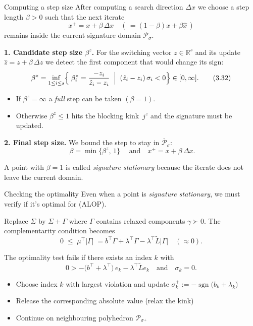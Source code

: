 \documentclass[aspectratio=169]{beamer}
\begin{document}
\begin{frame}{Computing a step size}
    After computing a search direction $\Delta x$ we choose a step length
    $\beta>0$ such that the next iterate
    \[
        x^{+} = x + \beta\,\Delta x \quad (\,= (1-\beta)x + \beta \hat{x}\,)
    \]
    remains inside the current signature domain $\mathcal P_{\sigma}$.

    \medskip
    \textbf{1.  Candidate step size $\beta^{z}$.}  For the switching vector
    $z\in\mathbb R^{s}$ and its update $\hat z = z + \beta\,\Delta z$ we
    detect the first component that would change its sign:
    \[
        \beta^{z}=\inf_{1\le i \le s} \Bigl\{\;\beta_i^{z}=\frac{-z_i}{\hat z_i-z_i}
        \;\Bigm|\;(\hat z_i-z_i)\,\sigma_i<0\Bigr\}\in[0,\infty] .  \tag{3.32}
    \]

    \begin{itemize}[<+(1)->]
        \item If $\beta^{z}=\infty$ a \emph{full} step can be taken
              $(\beta=1)$.
        \item Otherwise $\beta^{z}\le 1$ hits the blocking kink~$j^{z}$ and the
              signature must be updated.
    \end{itemize}

    \medskip
    \textbf{2.  Final step size.}  We bound the step to stay in
    $\overline{\mathcal P}_{\sigma}$:
    \[
        \boxed{\;\beta = \min\{\beta^{z},\,1\}\;} \quad\text{and}\quad
        x^{+}=x+\beta\,\Delta x. \tag{3.33}
    \]

    A point with $\beta=1$ is called \emph{signature stationary} because the
    iterate does not leave the current domain.
\end{frame}

\begin{frame}{Checking the optimality}
    Even when a point is \emph{signature stationary}, we must verify if it's optimal for (ALOP).

    \medskip
    Replace $\Sigma$ by $\Sigma+\Gamma$ where $\Gamma$ contains relaxed components $\gamma\succ 0$.
    The complementarity condition becomes
    \[
        0 \;\le\; \mu^{\top}|\Gamma| \;=
        b^{\top}\Gamma + \lambda^{\top}\Gamma - \lambda^{\top}\tilde{L}|\Gamma|
        \quad (\approx 0).
    \]

    The optimality test fails if there exists an index $k$ with
    \[
        0 > -\bigl(b^{\top}+\lambda^{\top}\bigr)\,e_k - \lambda^{\top}\tilde{L}e_k
        \quad\text{and}\quad \sigma_k = 0.\tag{3.34}
    \]

    \begin{itemize}[<+(1)->]
        \item Choose index $k$ with largest violation and update $\sigma_k^{+}
              := -\operatorname{sgn}\bigl(b_k+\lambda_k\bigr)$
        \item Release the corresponding absolute value (relax the kink)
        \item Continue on neighbouring polyhedron $\mathcal{P}_{\sigma^{+}}$
    \end{itemize}
\end{frame}
\end{document}
